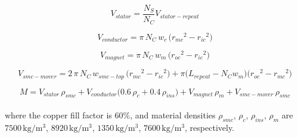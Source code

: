                 
                \begin{equation}
                    V_{stator} = \frac{N_S}{N_C}V_{stator-repeat}
                    \label{eq:rsm/LFSM/V_stator}
                \end{equation}
                
                
                \begin{equation}
                    V_{conductor} = \pi\,N_C\,w_c\,\big( {r_{mc}}^2-{r_{ic}}^2 \big)
                    \label{eq:rsm/LFSM/V_conductor}
                \end{equation}
                
                
                \begin{equation}
                    V_{magnet} = \pi\,N_C\,w_m\,\big( {r_{oc}}^2-{r_{ic}}^2 \big)
                    \label{eq:rsm/LFSM/V_magnet}
                \end{equation}
                
                
                \begin{equation}
                    V_{smc-mover} = 2\,\pi\,N_C\,w_{smc-top}\,\big( {r_{mc}}^2-{r_{ic}}^2 \big) + \pi \big( L_{repeat}-N_C w_m \big) \big( {r_{oc}}^2-{r_{mc}}^2 \big) 
                    \label{eq:rsm/LFSM/V_smc_mover}
                \end{equation}
                
                
                \begin{equation}
                    M= V_{stator}\,\rho_{smc} + V_{conductor} \big(0.6\,\rho_c + 0.4\,\rho_{ins} \big) + V_{magnet}\,\rho_{m} + V_{smc-mover}\,\rho_{smc}
                    \label{eq:rsm/LFSM/M}
                \end{equation} \\
                
                
                where the copper fill factor is $60\%$, and material densities $\rho_{smc}$, $\rho_c$, $\rho_{ins}$, $\rho_{m}$ are $7500\,\mathrm{kg/m^3}$, $8920\,\mathrm{kg/m^3}$, $1350\,\mathrm{kg/m^3}$, $7600\,\mathrm{kg/m^3}$, respectively. 
                

